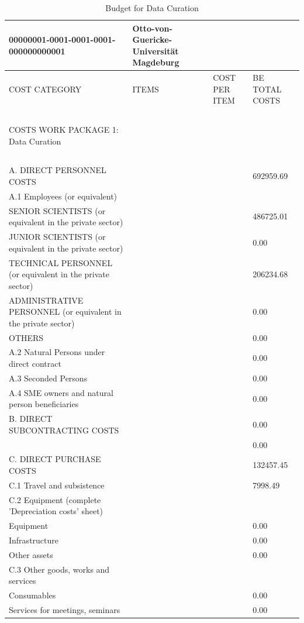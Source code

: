 
\begin{table}[H]
\centering
\caption{Budget for Data Curation}
\begin{tabular}{|l|l|l|l|}
\hline
00000001-0001-0001-0001-000000000001 & Otto-von-Guericke-Universität Magdeburg & ~ & ~ \\ \hline
COST CATEGORY & ITEMS & COST PER ITEM & BE TOTAL COSTS \\ \hline
~ & ~ & ~ & ~ \\ \hline
COSTS WORK PACKAGE 1: Data Curation & ~ & ~ & ~ \\ \hline
~ & ~ & ~ & ~ \\ \hline
A. DIRECT PERSONNEL COSTS & ~ & ~ & 692959.69 \\ \hline
A.1 Employees (or equivalent) & ~ & ~ & ~ \\ \hline
SENIOR SCIENTISTS (or equivalent in the private sector) & ~ & ~ & 486725.01 \\ \hline
JUNIOR SCIENTISTS (or equivalent in the private sector) & ~ & ~ & 0.00 \\ \hline
TECHNICAL PERSONNEL (or equivalent in the private sector) & ~ & ~ & 206234.68 \\ \hline
ADMINISTRATIVE PERSONNEL (or equivalent in the private sector) & ~ & ~ & 0.00 \\ \hline
OTHERS & ~ & ~ & 0.00 \\ \hline
A.2 Natural Persons under direct contract & ~ & ~ & 0.00 \\ \hline
A.3 Seconded Persons & ~ & ~ & 0.00 \\ \hline
A.4 SME owners and natural person beneficiaries & ~ &  & 0.00 \\ \hline
B. DIRECT SUBCONTRACTING COSTS & ~ & ~ & 0.00\\ \hline
~ & ~ & ~ & 0.00 \\ \hline
C. DIRECT PURCHASE COSTS & ~ & ~ & 132457.45 \\ \hline
C.1 Travel and subsistence & ~ &  & 7998.49 \\ \hline
C.2 Equipment (complete 'Depreciation costs' sheet) & ~ & ~ & ~ \\ \hline
Equipment & ~ &  & 0.00 \\ \hline
Infrastructure & ~ &  & 0.00 \\ \hline
Other assets & ~ &  & 0.00 \\ \hline
C.3 Other goods, works and services & ~ & ~ & ~ \\ \hline
Consumables & ~ &  & 0.00 \\ \hline
Services for meetings, seminars & ~ & ~ & 0.00 \\ \hline

\end{tabular}
\end{table}
